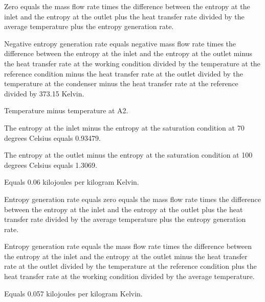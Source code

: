 Zero equals the mass flow rate times the difference between the entropy at the inlet and the entropy at the outlet plus the heat transfer rate divided by the average temperature plus the entropy generation rate.

Negative entropy generation rate equals negative mass flow rate times the difference between the entropy at the inlet and the entropy at the outlet minus the heat transfer rate at the working condition divided by the temperature at the reference condition minus the heat transfer rate at the outlet divided by the temperature at the condenser minus the heat transfer rate at the reference divided by 373.15 Kelvin.

Temperature minus temperature at A2.

The entropy at the inlet minus the entropy at the saturation condition at 70 degrees Celsius equals 0.93479.

The entropy at the outlet minus the entropy at the saturation condition at 100 degrees Celsius equals 1.3069.

Equals 0.06 kilojoules per kilogram Kelvin.

Entropy generation rate equals zero equals the mass flow rate times the difference between the entropy at the inlet and the entropy at the outlet plus the heat transfer rate divided by the average temperature plus the entropy generation rate.

Entropy generation rate equals the mass flow rate times the difference between the entropy at the inlet and the entropy at the outlet minus the heat transfer rate at the outlet divided by the temperature at the reference condition plus the heat transfer rate at the working condition divided by the average temperature.

Equals 0.057 kilojoules per kilogram Kelvin.